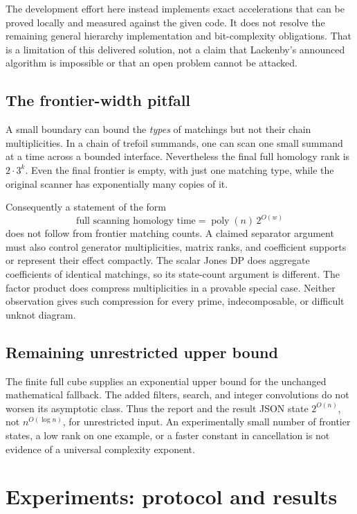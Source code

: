 \documentclass[11pt,letterpaper]{article}
\theoremstyle{definition}
\newcommand{\poly}{\operatorname{poly}}
\begin{document}
The development effort here instead implements exact accelerations that can be
proved locally and measured against the given code. It does not resolve the
remaining general hierarchy implementation and bit-complexity obligations.
That is a limitation of this delivered solution, not a claim that Lackenby's
announced algorithm is impossible or that an open problem cannot be attacked.

\subsection{The frontier-width pitfall}

A small boundary can bound the \emph{types} of matchings but not their chain
multiplicities. In a chain of trefoil summands, one can scan one small summand at
a time across a bounded interface. Nevertheless the final full homology rank is
$2\cdot3^k$. Even the final frontier is empty, with just one matching type, while
the original scanner has exponentially many copies of it.

Consequently a statement of the form
\[
 \text{full scanning homology time}=\poly(n)\,2^{O(w)}
\]
does not follow from frontier matching counts. A claimed separator argument
must also control generator multiplicities, matrix ranks, and coefficient
supports or represent their effect compactly. The scalar Jones DP does
aggregate coefficients of identical matchings, so its state-count argument is
different. The factor product does compress multiplicities in a provable
special case. Neither observation gives such compression for every prime,
indecomposable, or difficult unknot diagram.

\subsection{Remaining unrestricted upper bound}

The finite full cube supplies an exponential upper bound for the unchanged
mathematical fallback. The added filters, search, and integer convolutions do
not worsen its asymptotic class. Thus the report and the result JSON state
$2^{O(n)}$, not $n^{O(\log n)}$, for unrestricted input. An experimentally small
number of frontier states, a low rank on one example, or a faster constant in
cancellation is not evidence of a universal complexity exponent.

\section[Experiments]{Experiments: protocol and results}\label{sec:experiments}
\end{document}
